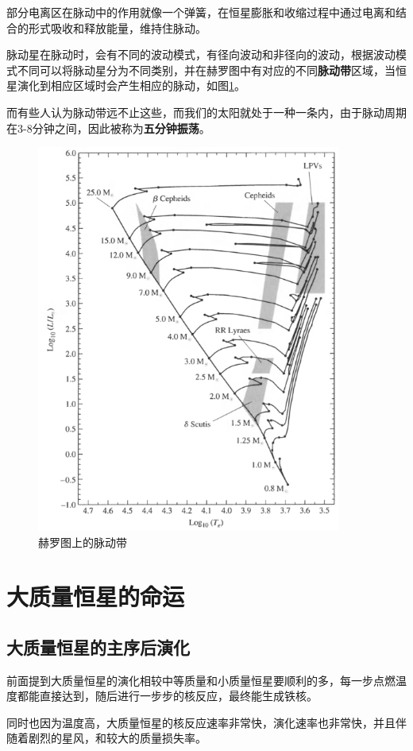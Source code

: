 \documentclass[openany]{ctexbook}
\begin{document}
部分电离区在脉动中的作用就像一个弹簧，在恒星膨胀和收缩过程中通过电离和结合的形式吸收和释放能量，维持住脉动。

脉动星在脉动时，会有不同的波动模式，有径向波动和非径向的波动，根据波动模式不同可以将脉动星分为不同类别，并在赫罗图中有对应的不同\textbf{脉动带}区域，当恒星演化到相应区域时会产生相应的脉动，如图\ref{fig:pusating}。

而有些人认为脉动带远不止这些，而我们的太阳就处于一种一条内，由于脉动周期在3-8分钟之间，因此被称为\textbf{五分钟振荡}。

\begin{figure}[hbt]
  \centering
  \includegraphics[width=10cm]{chapters/14/pusating}
  \caption{赫罗图上的脉动带}
  \label{fig:pusating}
\end{figure}

\chapter{大质量恒星的命运}
\section{大质量恒星的主序后演化}
前面提到大质量恒星的演化相较中等质量和小质量恒星要顺利的多，每一步点燃温度都能直接达到，随后进行一步步的核反应，最终能生成铁核。

同时也因为温度高，大质量恒星的核反应速率非常快，演化速率也非常快，并且伴随着剧烈的星风，和较大的质量损失率。
\end{document}
